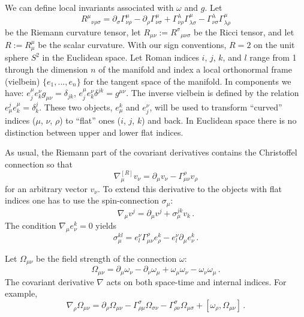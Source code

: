 We can define local invariants associated with $\omega$
and $g$. Let 
\begin{equation}
{R^\mu}_{\nu\rho\sigma}=\partial_\sigma \Gamma_{\nu\rho}^\mu -
\partial_\rho \Gamma_{\nu\sigma}^\mu +
\Gamma_{\nu\rho}^\lambda \Gamma_{\lambda\sigma}^\mu -
\Gamma_{\nu\sigma}^\lambda \Gamma_{\lambda\rho}^\mu 
\label{Riemann}
\end{equation}
be the Riemann curvature tensor, let $R_{\mu\nu}:={R^\sigma}_{\mu\nu\sigma}$
be the Ricci tensor, and let $R:=R^\mu_\mu$ be the scalar
curvature. 
With our sign
conventions, $R =2$ on the unit sphere $S^2$ in the Euclidean
space. 
Let
Roman indices $i$, $j$, $k$, and $l$ range from 1 through
the dimension $n$ of the manifold and index a local orthonormal frame
(vielbein) $\{ e_1,...,e_n\}$ for the tangent space of the manifold.
In components we have: $e_j^\mu e_k^\nu g_{\mu\nu}=\delta_{jk}$,
$e_j^\mu e_k^\nu \delta^{jk}=g^{\mu\nu}$. The inverse vielbein
is defined by the relation $e_\mu^j e^\mu_k=\delta_k^j$. These two
objects, $e_\mu^k$ and $e^\nu_j$, will be used to transform 
``curved'' indices ($\mu$, $\nu$, $\rho$) to ``flat'' ones
($i$, $j$, $k$) and back. In Euclidean space there is no distinction
between upper and lower flat indices.

As usual, the Riemann part of the covariant derivatives contains the
Christoffel connection so that
\begin{equation}
\nabla_\mu^{[R]}v_\nu = \partial_\mu v_\nu -\Gamma_{\mu\nu}^\rho v_\rho
\label{riemcov}
\end{equation}
for an arbitrary vector $v_\nu$. To extend this derivative to the objects
with flat indices one has to use the spin-connection $\sigma_\mu$:
\begin{equation}
\nabla_\mu v^j = \partial_\mu v^j +\sigma_\mu^{jk}v_k \,.\label{spinder}
\end{equation}
The condition $\nabla_\mu e_\nu^k=0$ yields
\begin{equation}
\sigma_\mu^{kl}=e_l^\nu \Gamma_{\mu\nu}^\rho e_\rho^k -
e^\nu_l \partial_\mu e_\nu^k \,.\label{spincon}
\end{equation} 

Let $\Omega_{\mu\nu}$ be the field strength of the connection
$\omega$:
\begin{equation}
\Omega_{\mu\nu}=\partial_\mu\omega_\nu - \partial_\nu\omega_\mu
+\omega_\mu\omega_\nu -\omega_\nu\omega_\mu \, .
\label{Omega}
\end{equation}
The covariant derivative $\nabla$ acts on both space-time and internal
indices. For example,
\begin{equation}
\nabla_\rho \Omega_{\mu\nu}=\partial_\rho \Omega_{\mu\nu}
-\Gamma_{\rho\mu}^\sigma \Omega_{\sigma\nu}
-\Gamma_{\rho\nu}^\sigma \Omega_{\mu\sigma}
+[\omega_\rho ,\Omega_{\mu\nu}] \,.
\end{equation}


